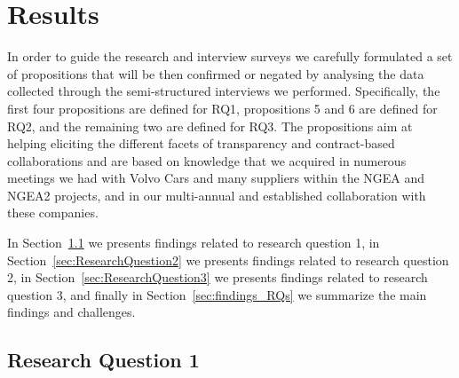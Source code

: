\section{Results}\label{sec:results}

In order to guide the
research and interview surveys %
we carefully formulated a set of propositions that will be then confirmed or negated by analysing the data collected through the semi-structured interviews we performed. Specifically, the first four propositions are defined for RQ1, propositions  5 and 6 are defined for RQ2,  and the remaining two are defined for RQ3.
The propositions aim at helping eliciting the different facets of transparency and contract-based collaborations and are based on knowledge that we acquired in numerous meetings we had with Volvo Cars and many suppliers within the NGEA and NGEA2 projects, and in our multi-annual and established collaboration with these companies. %



In Section~\ref{sec:ResearchQuestion1} we presents findings related to research question 1, in Section~\ref{sec:ResearchQuestion2} we presents findings related to research question 2,  in Section~\ref{sec:ResearchQuestion3} we presents findings related to research question 3, and finally
 in Section~\ref{sec:findings_RQs} we summarize the main findings and challenges.

\subsection{Research Question 1}\label{sec:ResearchQuestion1}

